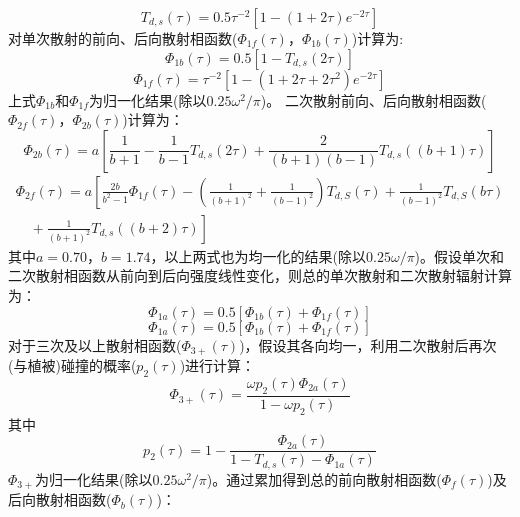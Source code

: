 \begin{equation}\label{T_ds_tau}
T_{d, s}(\tau)=0.5 \tau^{-2}\left[1-(1+2 \tau) e^{-2 \tau}\right]
\end{equation}
对单次散射的前向、后向散射相函数($\Phi_{1f}\left(\tau\right)$，$\Phi_{1b}\left(\tau\right)$)计算为:
\begin{equation}
\Phi_{1 b}(\tau)=0.5\left[1-T_{d, s}(2 \tau)\right]
\end{equation}
\begin{equation}
\Phi_{1 f}(\tau)=\tau^{-2}\left[1-\left(1+2 \tau+2 \tau^{2}\right) e^{-2 \tau}\right]
\end{equation}
上式$\Phi_{1b}$和$\Phi_{1f}$为归一化结果(除以$0.25\omega^2/\pi$)。
二次散射前向、后向散射相函数($\Phi_{2f}\left(\tau\right)，\Phi_{2b}\left(\tau\right)$)计算为：
\begin{equation}
\Phi_{2 b}(\tau)=a\left[\frac{1}{b+1}-\frac{1}{b-1} T_{d, s}(2 \tau)+\frac{2}{(b+1)(b-1)} T_{d, s}((b+1) \tau)\right]
\end{equation}
\begin{equation}
\begin{array}{c}\Phi_{2 f}(\tau)=a\left[\frac{2 b}{b^{2}-1} \Phi_{1 f}(\tau)-\left(\frac{1}{(b+1)^{2}}+\frac{1}{(b-1)^{2}}\right) T_{d, S}(\tau)+\frac{1}{(b-1)^{2}} T_{d, S}(b \tau)\right. \\ \left.\quad+\frac{1}{(b+1)^{2}} T_{d, s}((b+2) \tau)\right]\end{array}
\end{equation}
其中$a=0.70$，$b=1.74$，以上两式也为均一化的结果(除以$0.25\omega/\pi$)。假设单次和二次散射相函数从前向到后向强度线性变化，则总的单次散射和二次散射辐射计算为：
\begin{equation}
\Phi_{1 a}(\tau)=0.5\left[\Phi_{1 b}(\tau)+\Phi_{1 f}(\tau)\right]
\end{equation}
\begin{equation}
\Phi_{1 a}(\tau)=0.5\left[\Phi_{1 b}(\tau)+\Phi_{1 f}(\tau)\right]
\end{equation}
对于三次及以上散射相函数($\Phi_{3+}\left(\tau\right)$)，假设其各向均一，利用二次散射后再次(与植被)碰撞的概率($p_2\left(\tau\right)$)进行计算：
\begin{equation}
\Phi_{3+}(\tau)=\frac{\omega p_{2}(\tau) \Phi_{2 a}(\tau)}{1-\omega p_{2}(\tau)}
\end{equation}
其中
\begin{equation}
p_{2}(\tau)=1-\frac{\Phi_{2 a}(\tau)}{1-T_{d, s}(\tau)-\Phi_{1 a}(\tau)}
\end{equation}
$\Phi_{3+}$为归一化结果(除以$0.25\omega^2/\pi$)。通过累加得到总的前向散射相函数($\Phi_f\left(\tau\right)$)及后向散射相函数($\Phi_b\left(\tau\right)$)：
